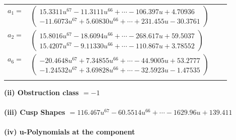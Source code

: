 \documentclass[1p]{elsarticle_modified}
\theoremstyle{definition}
\begin{document}
\begin{tabular}{m{7pt} m{180pt} m{7pt} m{180pt} }
\flushright $a_{1}=$&$\begin{pmatrix}15.3311 u^{67}-11.3111 u^{66}+\cdots-106.397 u+4.70936\\-11.6073 u^{67}+5.60830 u^{66}+\cdots+231.455 u-30.3761\end{pmatrix}$ \\
\flushright $a_{2}=$&$\begin{pmatrix}15.8016 u^{67}-18.6094 u^{66}+\cdots-268.617 u+59.5037\\15.4207 u^{67}-9.11330 u^{66}+\cdots-110.867 u+3.78552\end{pmatrix}$ \\
\flushright $a_{6}=$&$\begin{pmatrix}-20.4648 u^{67}+7.34855 u^{66}+\cdots-44.9005 u+53.2777\\-1.24532 u^{67}+3.69828 u^{66}+\cdots-32.5923 u-1.47535\end{pmatrix}$\\&\end{tabular}
\flushleft \textbf{(ii) Obstruction class $= -1$}\\~\\
\flushleft \textbf{(iii) Cusp Shapes $= 116.467 u^{67}-60.5514 u^{66}+\cdots-1629.96 u+139.411$}\\~\\
\newpage\renewcommand{\arraystretch}{1}
\flushleft \textbf{(iv) u-Polynomials at the component}\newline \\
\end{document}
